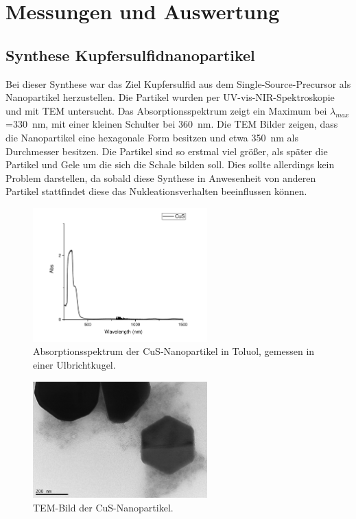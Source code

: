 \section{Messungen und Auswertung}

\subsection{Synthese Kupfersulfidnanopartikel}
	Bei dieser Synthese war das Ziel Kupfersulfid aus dem Single-Source-Precursor  als Nanopartikel herzustellen. 
	Die Partikel wurden per UV-vis-NIR-Spektroskopie und mit TEM untersucht.
	Das Absorptionsspektrum zeigt ein Maximum bei $\lambda_{max}$=\SI{330}{\nano\meter}, mit einer kleinen Schulter bei \SI{360}{\nano\meter}.
	Die TEM Bilder zeigen, dass die Nanopartikel eine hexagonale Form besitzen und etwa \SI{350}{\nano\meter} als Durchmesser besitzen.
	Die Partikel sind so erstmal viel größer, als später die Partikel und Gele um die sich die Schale bilden soll.
	Dies sollte allerdings kein Problem darstellen, da sobald diese Synthese in Anwesenheit von anderen Partikel stattfindet diese das Nukleationsverhalten beeinflussen können.
	
	
	\begin{figure}[H]
		\centering
		\includegraphics[width=0.6\textwidth]{Bilder/UV-CuS} 	
		\caption{Absorptionsspektrum der CuS-Nanopartikel in Toluol, gemessen in einer Ulbrichtkugel.}
		\label{fig:UV-CuS}
	\end{figure}
	
	\begin{figure}[H]
		\centering
		\includegraphics[width=0.6\textwidth]{Bilder/TEM-CuS} 	
		\caption{TEM-Bild der CuS-Nanopartikel.}
		\label{fig:TEM-CuS}
	\end{figure}
	
